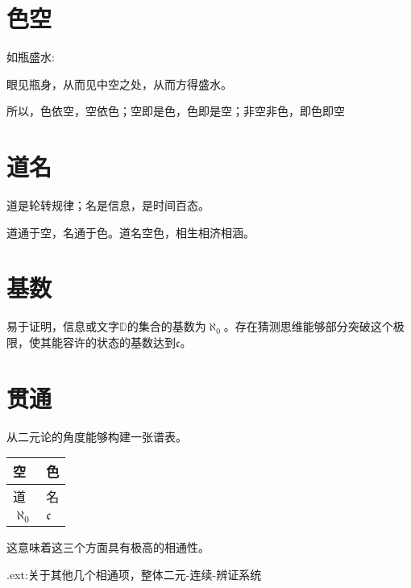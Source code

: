 \documentclass{ctexart}
\begin{document}
\section{色空}

如瓶盛水:

眼见瓶身，从而见中空之处，从而方得盛水。

所以，色依空，空依色；空即是色，色即是空；非空非色，即色即空

\section{道名}

道是轮转规律；名是信息，是时间百态。

道通于空，名通于色。道名空色，相生相济相涵。

\section{基数}

易于证明，信息或文字$\mathbb{D}$的集合的基数为$\aleph_0$。存在猜测思维能够部分突破这个极限，使其能容许的状态的基数达到$\mathfrak{c}$。

\section{贯通}

从二元论的角度能够构建一张谱表。

\begin{table}[h]
    \centering
    \begin{tabular}{|l|l|}
        \hline
        空 & 色 \\
        \hline
        道 & 名 \\
        \hline
        $\aleph_0$ & $\mathfrak{c}$ \\
        \hline
    \end{tabular}
\end{table}

这意味着这三个方面具有极高的相通性。

.ext:关于其他几个相通项，整体二元-连续-辨证系统
\end{document}
